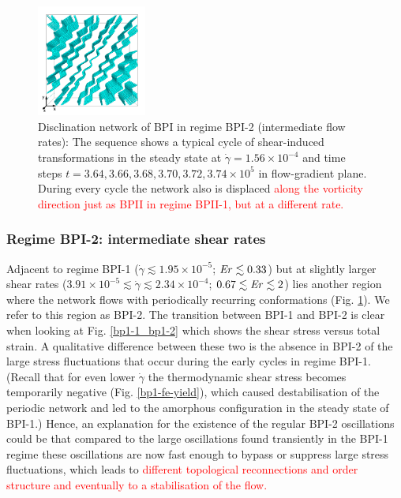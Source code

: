 \documentclass[8.5pt,twoside,twocolumn]{article}
\newcommand{\e}[1]{\times10^{#1}}
\newcommand{\gd}{\dot{\gamma}}
\newcommand{\rev}[1]{{\textcolor{red}{#1}}}
\begin{document}
\begin{figure}[htpb]
\includegraphics[width=0.32\textwidth]{disc-374k_run914r.png}
\caption{Disclination network of BPI in regime BPI-2 (intermediate flow rates): 
The sequence shows a typical cycle of shear-induced transformations in the 
steady state at $\gd=1.56\e{-4}$ and time steps 
$t=3.64, 3.66,3.68,3.70,3.72,3.74\e{5}$ in flow-gradient plane. 
During every cycle the network also is displaced 
\rev{along the vorticity direction just as BPII
in regime BPII-1, but at a different rate.
}
}
\label{bp1-2-disc}
\end{figure}

\subsubsection{Regime BPI-2: intermediate shear rates }

Adjacent to regime BPI-1 ($\gd\lesssim1.95\e{-5}$; $ {\it Er}\lesssim 0.33$) but 
at slightly larger shear rates ($3.91\e{-5}\lesssim\gd\lesssim 2.34\e{-4}$; $0.67\lesssim{\it Er}\lesssim2$)
lies another region where the network flows with periodically 
recurring conformations (Fig. \ref{bp1-2-disc}). 
We refer to this region as BPI-2. The transition between BPI-1 and BPI-2 
is clear when looking at Fig. \ref{bp1-1_bp1-2} 
which shows the shear stress versus total strain. 
A qualitative difference between these two is the absence in BPI-2 of the 
large stress fluctuations that occur during the early cycles in regime BPI-1.
(Recall that for even lower $\gd$ the thermodynamic shear stress becomes 
temporarily negative (Fig. \ref{bp1-fe-yield}), which 
caused destabilisation of the periodic network and led to the 
amorphous configuration in the steady state of BPI-1.)
Hence, an explanation
for the existence of the regular BPI-2 oscillations 
could be that compared to the large oscillations found transiently in
the BPI-1 regime these oscillations are now fast enough to bypass or suppress 
large stress fluctuations, which leads to
\rev{
different topological reconnections and order structure
and eventually to a stabilisation of the flow. 
}
\end{document}
